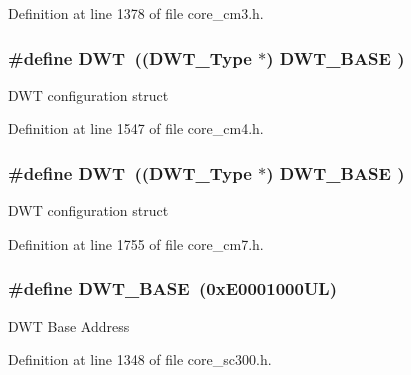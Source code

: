 Definition at line 1378 of file core\+\_\+cm3.\+h.

\subsubsection[{\texorpdfstring{D\+WT}{DWT}}]{\setlength{\rightskip}{0pt plus 5cm}\#define D\+WT~(({\bf D\+W\+T\+\_\+\+Type}       $\ast$)     {\bf D\+W\+T\+\_\+\+B\+A\+SE}      )}\hypertarget{group___c_m_s_i_s__core__base_gabbe5a060185e1d5afa3f85b14e10a6ce}{}\label{group___c_m_s_i_s__core__base_gabbe5a060185e1d5afa3f85b14e10a6ce}
D\+WT configuration struct 

Definition at line 1547 of file core\+\_\+cm4.\+h.

\subsubsection[{\texorpdfstring{D\+WT}{DWT}}]{\setlength{\rightskip}{0pt plus 5cm}\#define D\+WT~(({\bf D\+W\+T\+\_\+\+Type}       $\ast$)     {\bf D\+W\+T\+\_\+\+B\+A\+SE}      )}\hypertarget{group___c_m_s_i_s__core__base_gabbe5a060185e1d5afa3f85b14e10a6ce}{}\label{group___c_m_s_i_s__core__base_gabbe5a060185e1d5afa3f85b14e10a6ce}
D\+WT configuration struct 

Definition at line 1755 of file core\+\_\+cm7.\+h.

\subsubsection[{\texorpdfstring{D\+W\+T\+\_\+\+B\+A\+SE}{DWT_BASE}}]{\setlength{\rightskip}{0pt plus 5cm}\#define D\+W\+T\+\_\+\+B\+A\+SE~(0x\+E0001000\+U\+L)}\hypertarget{group___c_m_s_i_s__core__base_gafdab534f961bf8935eb456cb7700dcd2}{}\label{group___c_m_s_i_s__core__base_gafdab534f961bf8935eb456cb7700dcd2}
D\+WT Base Address 

Definition at line 1348 of file core\+\_\+sc300.\+h.

